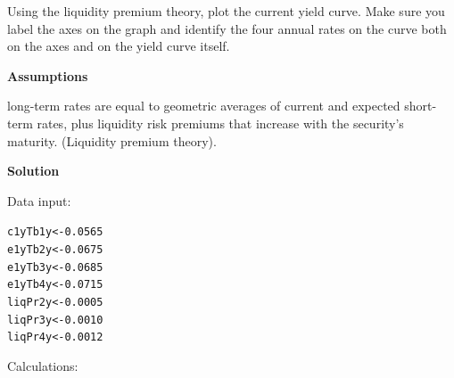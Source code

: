 \documentclass{article}\usepackage[]{graphicx}\usepackage[]{xcolor}
\makeatletter
\newcommand{\hlnum}[1]{\textcolor[rgb]{0.686,0.059,0.569}{#1}}%
\newcommand{\hlstd}[1]{\textcolor[rgb]{0.345,0.345,0.345}{#1}}%
\newcommand{\hlkwb}[1]{\textcolor[rgb]{0.69,0.353,0.396}{#1}}%
\newenvironment{kframe}{%
 \def\at@end@of@kframe{}%
 \ifinner\ifhmode%
  \def\at@end@of@kframe{\end{minipage}}%
  \begin{minipage}{\columnwidth}%
 \fi\fi%
 \def\FrameCommand##1{\hskip\@totalleftmargin \hskip-\fboxsep
 \colorbox{shadecolor}{##1}\hskip-\fboxsep
     \hskip-\linewidth \hskip-\@totalleftmargin \hskip\columnwidth}%
 \MakeFramed {\advance\hsize-\width
   \@totalleftmargin\z@ \linewidth\hsize
   \@setminipage}}%
 {\par\unskip\endMakeFramed%
 \at@end@of@kframe}
\newenvironment{knitrout}{}{} %
\makeatother
\begin{document}
Using the liquidity premium theory, plot the current yield curve. Make sure you label the axes on 
the graph and identify the four annual rates on the curve both on the axes and on the yield curve itself.

\textbf{Assumptions}\par
long-term rates are equal to geometric averages of current and expected short-term rates, plus 
liquidity risk premiums that increase with the security’s maturity. (Liquidity premium theory).\par
\textbf{Solution}\par
Data input:\par
\begin{knitrout}
\color{fgcolor}\begin{kframe}
\begin{alltt}
\hlstd{c1yTb1y} \hlkwb{<-} \hlnum{0.0565}
\hlstd{e1yTb2y} \hlkwb{<-} \hlnum{0.0675}
\hlstd{e1yTb3y} \hlkwb{<-} \hlnum{0.0685}
\hlstd{e1yTb4y} \hlkwb{<-} \hlnum{0.0715}
\hlstd{liqPr2y} \hlkwb{<-} \hlnum{0.0005}
\hlstd{liqPr3y} \hlkwb{<-} \hlnum{0.0010}
\hlstd{liqPr4y} \hlkwb{<-} \hlnum{0.0012}
\end{alltt}
\end{kframe}
\end{knitrout}
Calculations:\par
\end{document}
